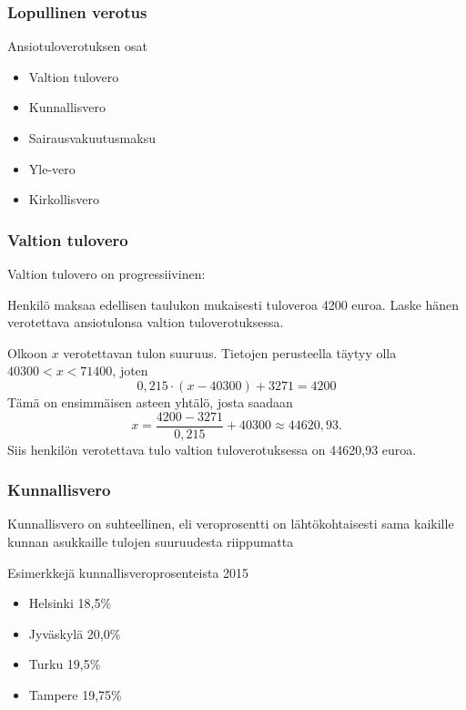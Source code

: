 \documentclass[]{beamer}\usepackage[]{graphicx}\usepackage[]{color}
\begin{document}
\begin{frame}
\frametitle{Lopullinen verotus}
\begin{block}{Ansiotuloverotuksen osat}
	\begin{itemize}
		\item Valtion tulovero
		\item Kunnallisvero
		\item Sairausvakuutusmaksu
		\item Yle-vero
		\item Kirkollisvero
	\end{itemize}
\end{block}

\end{frame}

\begin{frame}
\frametitle{Valtion tulovero}
\pause
Valtion tulovero on progressiivinen:
\begin{table}[h]
	\begin{small}
	    
	\end{small}
  \caption*{Tuloveroasteikko 2015}
\end{table}
\end{frame}


\begin{frame}
	\begin{esim}
		Henkilö maksaa edellisen taulukon mukaisesti tuloveroa 4200 euroa. Laske hänen verotettava ansiotulonsa valtion tuloverotuksessa.
	\end{esim}
	\begin{ratkaisu}
		\pause Olkoon \(x\) verotettavan tulon suuruus. \pause Tietojen perusteella täytyy olla \(40300 < x < 71400\), \pause joten 
		\[
			0,215\cdot(x-40300) + 3271 = 4200
		\]\pause
		Tämä on ensimmäisen asteen yhtälö, josta saadaan \pause
		\[
			x = \frac{4200-3271}{0,215}+40300 \approx 44620,93.
		\] \pause
		Siis henkilön verotettava tulo valtion tuloverotuksessa on 44620,93 euroa.
	\end{ratkaisu}
\end{frame}
\begin{frame}
\frametitle{Kunnallisvero}
\pause
Kunnallisvero on suhteellinen, eli veroprosentti on lähtökohtaisesti sama kaikille kunnan asukkaille tulojen suuruudesta riippumatta
	\begin{block}{Esimerkkejä kunnallisveroprosenteista 2015}
		\begin{itemize}
			\item Helsinki 18,5\% 
			\item Jyväskylä 20,0\%
			\item Turku 19,5\%
			\item Tampere 19,75\%
		\end{itemize}
	\end{block}
\end{frame}
\end{document}
